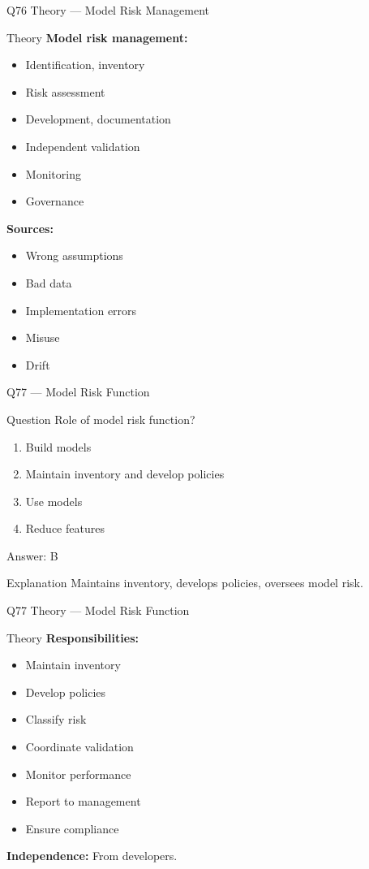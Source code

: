 \documentclass[aspectratio=169,8pt]{beamer}
\begin{document}
	\begin{frame}{Q76 Theory --- Model Risk Management}
		\begin{block}{Theory}
			\textbf{Model risk management:}
			\begin{itemize}
				\item Identification, inventory
				\item Risk assessment
				\item Development, documentation
				\item Independent validation
				\item Monitoring
				\item Governance
			\end{itemize}
			\textbf{Sources:}
			\begin{itemize}
				\item Wrong assumptions
				\item Bad data
				\item Implementation errors
				\item Misuse
				\item Drift
			\end{itemize}
		\end{block}
	\end{frame}
	
	\begin{frame}{Q77 --- Model Risk Function}
		\begin{block}{Question}
			Role of model risk function?
		\end{block}
		\begin{enumerate}[label=\Alph*.]
			\item Build models
			\item Maintain inventory and develop policies
			\item Use models
			\item Reduce features
		\end{enumerate}
		\begin{exampleblock}{Answer: B}
		\end{exampleblock}
		\begin{block}{Explanation}
			Maintains inventory, develops policies, oversees model risk.
		\end{block}
	\end{frame}
	
	\begin{frame}{Q77 Theory --- Model Risk Function}
		\begin{block}{Theory}
			\textbf{Responsibilities:}
			\begin{itemize}
				\item Maintain inventory
				\item Develop policies
				\item Classify risk
				\item Coordinate validation
				\item Monitor performance
				\item Report to management
				\item Ensure compliance
			\end{itemize}
			\textbf{Independence:} From developers.
		\end{block}
	\end{frame}
	
\end{document}
